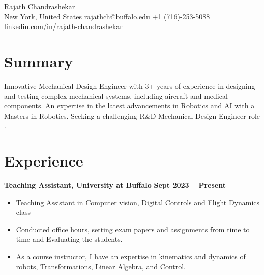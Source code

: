 \documentclass[10pt, letterpaper]{article}
\begin{document}
\begin{center}
    {\fontsize{25 pt}{25 pt}\selectfont Rajath Chandrashekar}\\
    \vspace{5 pt}
    {New York, United States} \quad\textbar\quad
    \href{mailto:rajathch@buffalo.edu}{rajathch@buffalo.edu} \quad\textbar\quad
    +1 (716)-253-5088 \quad\textbar\quad
    \href{https://linkedin.com/in/rajath-chandrashekar-80432915a}{linkedin.com/in/rajath-chandrashekar}\\
\end{center}

\section{Summary}
Innovative Mechanical Design Engineer with 3+ years of experience in designing and testing complex mechanical systems, including aircraft and medical components. An expertise in the latest advancements in Robotics and AI with a Masters in Robotics. Seeking a challenging R\&D Mechanical Design Engineer role .

\section{Experience}
\textbf{Teaching Assistant, University at Buffalo} \hfill \textbf{Sept 2023 – Present}\\
\begin{itemize}
    \item Teaching Assistant in Computer vision, Digital Controls and Flight Dynamics class
    \item Conducted office hours, setting exam papers and assignments from time to time and Evaluating the students.
    \item As a course instructor, I have an expertise in kinematics and dynamics of robots, Transformations, Linear Algebra, and Control.
\end{itemize}
\end{document}
